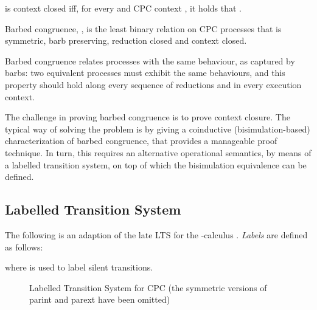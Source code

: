 \documentclass{LMCS}
\begin{document}
\begin{defi}
\label{def:cont-close}
 is context closed iff, for every  and CPC context
, 
it holds that .
\end{defi}

\begin{defi}
\label{def:barb-con}
Barbed congruence, , is the least binary relation on CPC processes that is symmetric, barb preserving, reduction closed and
context closed.
\end{defi}

Barbed congruence relates processes with the same
behaviour, as captured by barbs: two equivalent processes must exhibit the same behaviours, 
and this property should hold along every sequence of reductions and in every execution context.

The challenge in proving barbed congruence is to prove
context closure.  The typical way of solving the problem is by giving
a coinductive (bisimulation-based) characterization of barbed
congruence, that provides a manageable proof technique. In turn, this
requires an alternative operational semantics, by means of a labelled
transition system, on top of which the bisimulation equivalence can be
defined.

\subsection{Labelled Transition System}
\label{sec:LTS}

The following is an adaption of the late LTS for the
-calculus \cite{milner.parrow.ea:calculus-mobile}.
{\em Labels} are defined as follows:

where  is used to label silent transitions.
\begin{figure}[t]

\caption{Labelled Transition System for CPC (the symmetric versions of {\sf parint} and {\sf parext} have been omitted)}
\label{fig:lts}
\end{figure}
\end{document}
